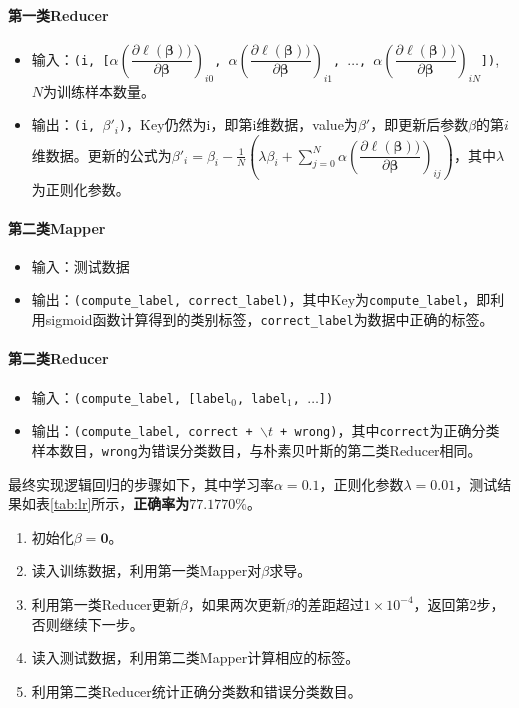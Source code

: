 \documentclass{ML}
\begin{document}
\paragraph{第一类Reducer}
\begin{itemize}
    \item 输入：\texttt{(i, [$\alpha \left(\dfrac{\partial \ell(\mathbf{\beta}))}{\partial \mathbf{\beta}}\right)_{i0}$, $\alpha \left(\dfrac{\partial \ell(\mathbf{\beta}))}{\partial \mathbf{\beta}}\right)_{i1}$, $\dots$, $\alpha \left(\dfrac{\partial \ell(\mathbf{\beta}))}{\partial \mathbf{\beta}}\right)_{iN}$])}, $N$为训练样本数量。
    \item 输出：\texttt{(i, $\beta'_i$)}，Key仍然为i，即第i维数据，value为$\beta'$，即更新后参数$\beta$的第$i$维数据。更新的公式为$\beta'_i = \beta_i - \frac{1}{N}(\lambda \beta_i + \sum_{j=0}^{N}\alpha \left(\dfrac{\partial \ell(\mathbf{\beta}))}{\partial \mathbf{\beta}}\right)_{ij})$，其中$\lambda$为正则化参数。
\end{itemize}

\paragraph{第二类Mapper}
\begin{itemize}
    \item 输入：测试数据
    \item 输出：\texttt{(compute\_label, correct\_label)}，其中Key为\texttt{compute\_label}，即利用sigmoid函数计算得到的类别标签，\texttt{correct\_label}为数据中正确的标签。
\end{itemize}

\paragraph{第二类Reducer}
\begin{itemize}
    \item 输入：\texttt{(compute\_label, [label$_0$, label$_1$, $\dots$])}
    \item 输出：\texttt{(compute\_label, correct + $\backslash t$ + wrong)}，其中\texttt{correct}为正确分类样本数目，\texttt{wrong}为错误分类数目，与朴素贝叶斯的第二类Reducer相同。
\end{itemize}

最终实现逻辑回归的步骤如下，其中学习率$\alpha=0.1$，正则化参数$\lambda=0.01$，测试结果如表\ref{tab:lr}所示，\textbf{正确率为$77.1770\%$}。
\begin{enumerate}
    \item 初始化$\beta = \mathbf{0}$。
    \item 读入训练数据，利用第一类Mapper对$\beta$求导。
    \item 利用第一类Reducer更新$\beta$，如果两次更新$\beta$的差距超过$1\times10^{-4}$，返回第2步，否则继续下一步。
    \item 读入测试数据，利用第二类Mapper计算相应的标签。
    \item 利用第二类Reducer统计正确分类数和错误分类数目。
\end{enumerate}
\end{document}
